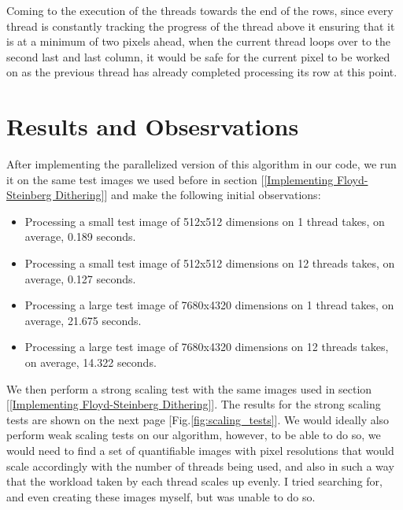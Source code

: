 \documentclass{article}
\begin{document}
\medskip
\noindent Coming to the execution of the threads towards the end of the rows, since every thread is constantly tracking the progress of the thread above it ensuring that it is at a minimum of two pixels ahead, when the current thread loops over to the second last and last column, it would be safe for the current pixel to be worked on  as the previous thread has already completed processing its row at this point.

\section{Results and Obsesrvations}

\noindent After implementing the parallelized version of this algorithm in our code, we run it on the same test images we used before in section [\ref{Implementing Floyd-Steinberg Dithering}] and make the following initial observations:

\begin{itemize}
    \item Processing a small test image of 512x512 dimensions on 1 thread takes, on average, 0.189 seconds.

    \item Processing a small test image of 512x512 dimensions on 12 threads takes, on average, 0.127 seconds.

    \item Processing a large test image of 7680x4320 dimensions on 1 thread takes, on average, 21.675  seconds.

    \item Processing a large test image of 7680x4320 dimensions on 12 threads takes, on average, 14.322 seconds.
\end{itemize}

\medskip
\noindent We then perform a strong scaling test with the same images used in section [\ref{Implementing Floyd-Steinberg Dithering}]. The results for the strong scaling tests are shown on the next page [Fig.\ref{fig:scaling_tests}]. We would ideally also perform weak scaling tests on our algorithm, however, to be able to do so, we would need to find a set of quantifiable images with pixel resolutions that would scale accordingly with the number of threads being used, and also in such a way that the workload taken by each thread scales up evenly. I tried searching for, and even creating these images myself, but was unable to do so.
\end{document}
